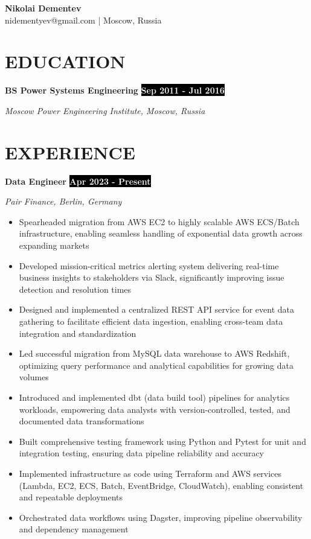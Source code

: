 \documentclass[11pt,a4paper]{article}
\newcommand{\timeperiod}[1]{%
    \hfill{\small\colorbox{black}{\textcolor{white}{\textbf{#1}}}}\par%
}
\begin{document}
\begin{flushright}
{\huge\textbf{Nikolai Dementev}}\\[4pt]
{\normalsize nidementyev@gmail.com | Moscow, Russia}
\end{flushright}

\section{EDUCATION}
\textbf{BS Power Systems Engineering}\timeperiod{Sep 2011 - Jul 2016}
\textit{Moscow Power Engineering Institute, Moscow, Russia}

\section{EXPERIENCE}
\textbf{Data Engineer}\timeperiod{Apr 2023 - Present}
\textit{Pair Finance, Berlin, Germany}
\begin{itemize}
    \item Spearheaded migration from AWS EC2 to highly scalable AWS ECS/Batch infrastructure, enabling seamless handling of exponential data growth across expanding markets
    \item Developed mission-critical metrics alerting system delivering real-time business insights to stakeholders via Slack, significantly improving issue detection and resolution times
    \item Designed and implemented a centralized REST API service for event data gathering to facilitate efficient data ingestion, enabling cross-team data integration and standardization
    \item Led successful migration from MySQL data warehouse to AWS Redshift, optimizing query performance and analytical capabilities for growing data volumes
    \item Introduced and implemented dbt (data build tool) pipelines for analytics workloads, empowering data analysts with version-controlled, tested, and documented data transformations
    \item Built comprehensive testing framework using Python and Pytest for unit and integration testing, ensuring data pipeline reliability and accuracy
    \item Implemented infrastructure as code using Terraform and AWS services (Lambda, EC2, ECS, Batch, EventBridge, CloudWatch), enabling consistent and repeatable deployments
    \item Orchestrated data workflows using Dagster, improving pipeline observability and dependency management
\end{itemize}
\end{document}
